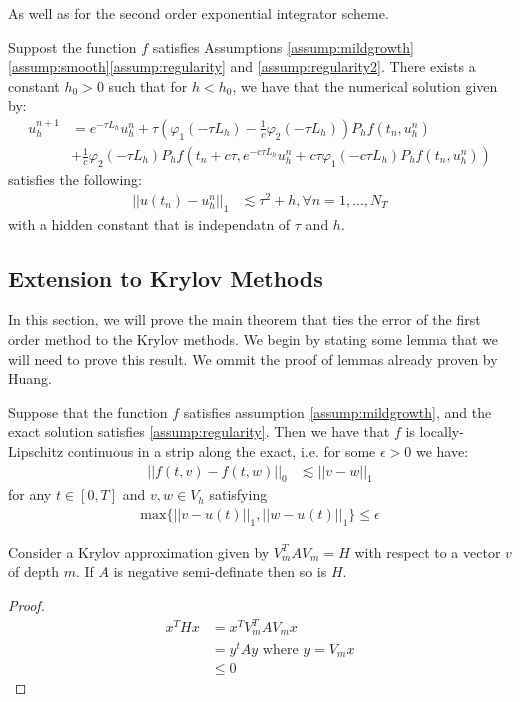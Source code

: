 As well as for the second order exponential integrator scheme.
\begin{theorem}\label{theorem:standard2}
    Suppost the function $f$ satisfies Assumptions \ref{assump:mildgrowth}\ref{assump:smooth}\ref{assump:regularity} and \ref{assump:regularity2}.
    There exists a constant $h_0 > 0$ such that for $h<h_0$, we have that the numerical solution given by:
    \begin{align*}
        u_h^{n+1} &= e^{-\tau L_h}u_h^n + \tau (\varphi_1(-\tau L_h) - \frac{1}{c}\varphi_2(-\tau L_h))P_hf(t_n,u_h^n)\\
        &+\frac{1}{c}\varphi_2(-\tau L_h)P_hf(t_n + c\tau,e^{-c\tau L_h}u_h^n + c\tau\varphi_1(-c\tau L_h)P_hf(t_n,u_h^n))
    \end{align*}
    satisfies the following:
    \begin{align*}
        ||u(t_n) - u_h^n||_1 &\lesssim \tau^2 + h, \forall n =1,...,N_T
    \end{align*}
    with a hidden constant that is independatn of $\tau$ and $h$.
\end{theorem}

\subsection{Extension to Krylov Methods}

In this section, we will prove the main theorem that ties the error of the first order method to the Krylov methods.
We begin by stating some lemma that we will need to prove this result.
We ommit the proof of lemmas already proven by Huang\cite{Huang2022}.

\begin{lemma} \label{lemma:Lipschitz}
    Suppose that the function $f$ satisfies assumption \ref{assump:mildgrowth}, and the exact solution satisfies \ref{assump:regularity}.
    Then we have that $f$ is locally-Lipschitz continuous in a strip along the exact, i.e. for some $\epsilon > 0$ we have:
    \begin{align*}
        ||f(t,v) - f(t,w)||_0 &\lesssim ||v-w||_1
    \end{align*}
    for any $t\in [0,T]$ and $v,w \in V_h$ satisfying
    \begin{align*}
        \text{max}\{||v-u(t)||_1,||w-u(t)||_1\}\leq \epsilon
    \end{align*}
\end{lemma}

\begin{lemma}
    Consider a Krylov approximation given by $V_m^TAV_m = H$ with respect to a vector $v$ of depth $m$.
    If $A$ is negative semi-definate then so is $H$.
\end{lemma}
\begin{proof}
    \begin{align*}
        x^T Hx &= x^T V_m^TAV_mx\\
        &= y^tAy \text{ where $y = V_mx$}\\
        &\leq 0
    \end{align*}
\end{proof}


